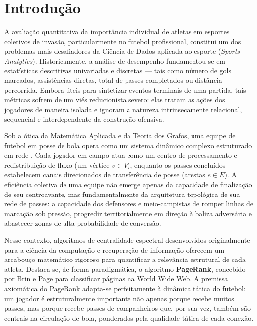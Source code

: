 \documentclass[10pt,a4paper]{article}
\theoremstyle{definition}
\theoremstyle{plain}
\theoremstyle{remark}
\begin{document}
\section{\sffamily Introdução}

A avaliação quantitativa da importância individual de atletas em esportes coletivos de invasão, particularmente no futebol profissional, constitui um dos problemas mais desafiadores da Ciência de Dados aplicada ao esporte (\textit{Sports Analytics}). Historicamente, a análise de desempenho fundamentou-se em estatísticas descritivas univariadas e discretas --- tais como número de gols marcados, assistências diretas, total de passes completados ou distância percorrida. Embora úteis para sintetizar eventos terminais de uma partida, tais métricas sofrem de um viés reducionista severo: elas tratam as ações dos jogadores de maneira isolada e ignoram a natureza intrinsecamente relacional, sequencial e interdependente da construção ofensiva.

Sob a ótica da Matemática Aplicada e da Teoria dos Grafos, uma equipe de futebol em posse de bola opera como um sistema dinâmico complexo estruturado em rede \cite{pena2012, buldu2018}. Cada jogador em campo atua como um centro de processamento e redistribuição de fluxo (um vértice $v \in V$), enquanto os passes concluídos estabelecem canais direcionados de transferência de posse (arestas $e \in E$). A eficiência coletiva de uma equipe não emerge apenas da capacidade de finalização de seu centroavante, mas fundamentalmente da arquitetura topológica de sua rede de passes: a capacidade dos defensores e meio-campistas de romper linhas de marcação sob pressão, progredir territorialmente em direção à baliza adversária e abastecer zonas de alta probabilidade de conversão.

Nesse contexto, algoritmos de centralidade espectral desenvolvidos originalmente para a ciência da computação e recuperação de informação oferecem um arcabouço matemático rigoroso para quantificar a relevância estrutural de cada atleta. Destaca-se, de forma paradigmática, o algoritmo \textbf{PageRank}, concebido por Brin e Page \cite{brin1998} para classificar páginas na World Wide Web. A premissa axiomática do PageRank adapta-se perfeitamente à dinâmica tática do futebol: um jogador é estruturalmente importante não apenas porque recebe muitos passes, mas porque recebe passes de companheiros que, por sua vez, também são centrais na circulação de bola, ponderados pela qualidade tática de cada conexão.
\end{document}
